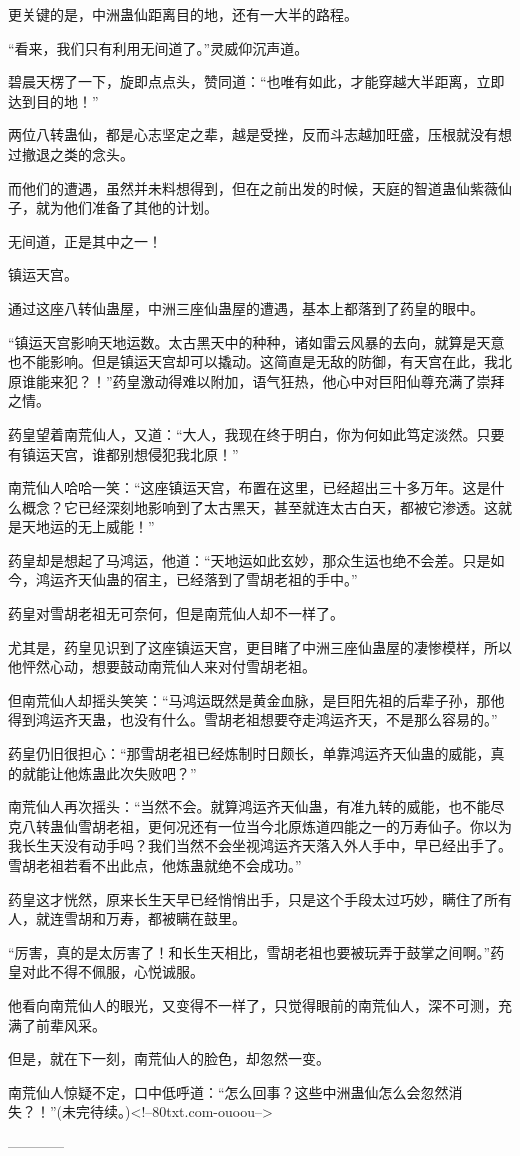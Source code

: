 \begin{this_body}
更关键的是，中洲蛊仙距离目的地，还有一大半的路程。

“看来，我们只有利用无间道了。”灵威仰沉声道。

碧晨天楞了一下，旋即点点头，赞同道：“也唯有如此，才能穿越大半距离，立即达到目的地！”

两位八转蛊仙，都是心志坚定之辈，越是受挫，反而斗志越加旺盛，压根就没有想过撤退之类的念头。

而他们的遭遇，虽然并未料想得到，但在之前出发的时候，天庭的智道蛊仙紫薇仙子，就为他们准备了其他的计划。

无间道，正是其中之一！

镇运天宫。

通过这座八转仙蛊屋，中洲三座仙蛊屋的遭遇，基本上都落到了药皇的眼中。

“镇运天宫影响天地运数。太古黑天中的种种，诸如雷云风暴的去向，就算是天意也不能影响。但是镇运天宫却可以撬动。这简直是无敌的防御，有天宫在此，我北原谁能来犯？！”药皇激动得难以附加，语气狂热，他心中对巨阳仙尊充满了崇拜之情。

药皇望着南荒仙人，又道：“大人，我现在终于明白，你为何如此笃定淡然。只要有镇运天宫，谁都别想侵犯我北原！”

南荒仙人哈哈一笑：“这座镇运天宫，布置在这里，已经超出三十多万年。这是什么概念？它已经深刻地影响到了太古黑天，甚至就连太古白天，都被它渗透。这就是天地运的无上威能！”

药皇却是想起了马鸿运，他道：“天地运如此玄妙，那众生运也绝不会差。只是如今，鸿运齐天仙蛊的宿主，已经落到了雪胡老祖的手中。”

药皇对雪胡老祖无可奈何，但是南荒仙人却不一样了。

尤其是，药皇见识到了这座镇运天宫，更目睹了中洲三座仙蛊屋的凄惨模样，所以他怦然心动，想要鼓动南荒仙人来对付雪胡老祖。

但南荒仙人却摇头笑笑：“马鸿运既然是黄金血脉，是巨阳先祖的后辈子孙，那他得到鸿运齐天蛊，也没有什么。雪胡老祖想要夺走鸿运齐天，不是那么容易的。”

药皇仍旧很担心：“那雪胡老祖已经炼制时日颇长，单靠鸿运齐天仙蛊的威能，真的就能让他炼蛊此次失败吧？”

南荒仙人再次摇头：“当然不会。就算鸿运齐天仙蛊，有准九转的威能，也不能尽克八转蛊仙雪胡老祖，更何况还有一位当今北原炼道四能之一的万寿仙子。你以为我长生天没有动手吗？我们当然不会坐视鸿运齐天落入外人手中，早已经出手了。雪胡老祖若看不出此点，他炼蛊就绝不会成功。”

药皇这才恍然，原来长生天早已经悄悄出手，只是这个手段太过巧妙，瞒住了所有人，就连雪胡和万寿，都被瞒在鼓里。

“厉害，真的是太厉害了！和长生天相比，雪胡老祖也要被玩弄于鼓掌之间啊。”药皇对此不得不佩服，心悦诚服。

他看向南荒仙人的眼光，又变得不一样了，只觉得眼前的南荒仙人，深不可测，充满了前辈风采。

但是，就在下一刻，南荒仙人的脸色，却忽然一变。

南荒仙人惊疑不定，口中低呼道：“怎么回事？这些中洲蛊仙怎么会忽然消失？！”(未完待续。)<!--80txt.com-ouoou-->

------------

\end{this_body}

